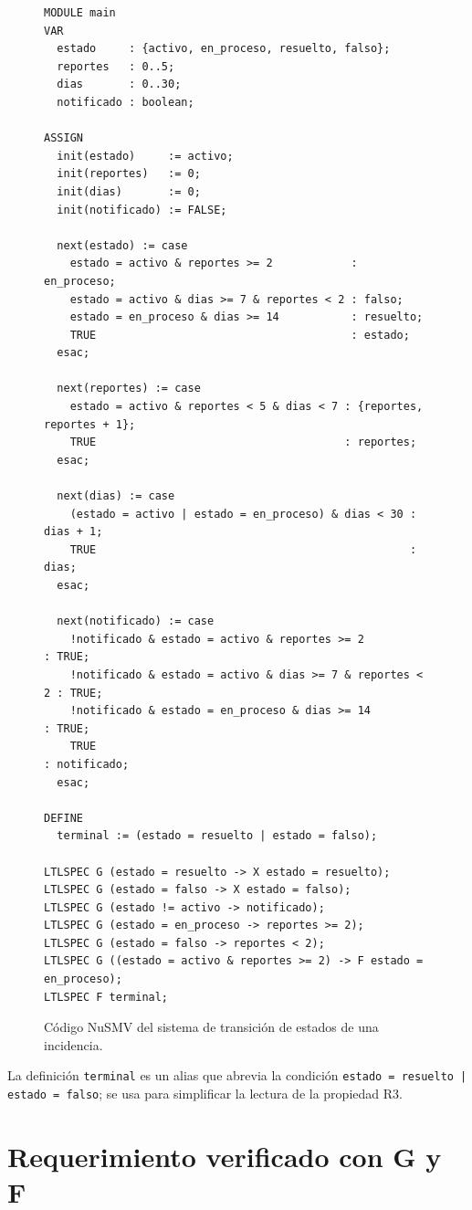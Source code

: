 \documentclass[11pt,a4paper]{article}
\begin{document}
\begin{figure}[H]
\centering
\begin{lstlisting}[basicstyle=\ttfamily\footnotesize]
MODULE main
VAR
  estado     : {activo, en_proceso, resuelto, falso};
  reportes   : 0..5;
  dias       : 0..30;
  notificado : boolean;

ASSIGN
  init(estado)     := activo;
  init(reportes)   := 0;
  init(dias)       := 0;
  init(notificado) := FALSE;

  next(estado) := case
    estado = activo & reportes >= 2            : en_proceso;
    estado = activo & dias >= 7 & reportes < 2 : falso;
    estado = en_proceso & dias >= 14           : resuelto;
    TRUE                                       : estado;
  esac;

  next(reportes) := case
    estado = activo & reportes < 5 & dias < 7 : {reportes, reportes + 1};
    TRUE                                      : reportes;
  esac;

  next(dias) := case
    (estado = activo | estado = en_proceso) & dias < 30 : dias + 1;
    TRUE                                                : dias;
  esac;

  next(notificado) := case
    !notificado & estado = activo & reportes >= 2            : TRUE;
    !notificado & estado = activo & dias >= 7 & reportes < 2 : TRUE;
    !notificado & estado = en_proceso & dias >= 14           : TRUE;
    TRUE                                                     : notificado;
  esac;

DEFINE
  terminal := (estado = resuelto | estado = falso);

LTLSPEC G (estado = resuelto -> X estado = resuelto);
LTLSPEC G (estado = falso -> X estado = falso);
LTLSPEC G (estado != activo -> notificado);
LTLSPEC G (estado = en_proceso -> reportes >= 2);
LTLSPEC G (estado = falso -> reportes < 2);
LTLSPEC G ((estado = activo & reportes >= 2) -> F estado = en_proceso);
LTLSPEC F terminal;
\end{lstlisting}
\caption{Código NuSMV del sistema de transición de estados de una incidencia.}
\label{fig:codigo-nusmv}
\end{figure}

La definición \texttt{terminal} es un alias que abrevia la condición \texttt{estado = resuelto | estado = falso}; se usa para simplificar la lectura de la propiedad R3.

\section{Requerimiento verificado con G y F}
\end{document}

